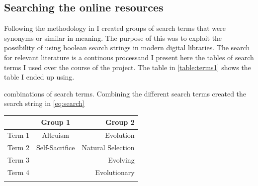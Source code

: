 \documentclass[a4paper]{book}
\begin{document}
\subsection{Searching the online resources }
Following the methodology in \cite{oates_researching_2005} I created groups of search terms that were synonyms or similar in meaning. The purpose of this was to exploit the possibility of using boolean search strings in modern digital libraries. The search for relevant literature is a continous processand I present here the tables of search terms I used over the course of the project. The table in \ref{table:terms1} shows the table I ended up using.%

%     
%
%
\noindent
combinations of search terms. Combining the different search terms created the search string in \ref{eq:search}
\\
%
\begin{center}
    \begin{tabular}{| l | c | r |}
      \hline
       & Group 1 & Group 2 \\ \hline
       Term 1 & Altruism 	& Evolution  \\ \hline
       Term 2 & Self-Sacrifice	& Natural Selection \\ \hline
       Term 3 & 		& Evolving   \\ \hline
       Term 4 & 		& Evolutionary  \\ \hline
       \hline
	\label{table:terms2}
       \end{tabular}
      \end{center}
      
\end{document}
